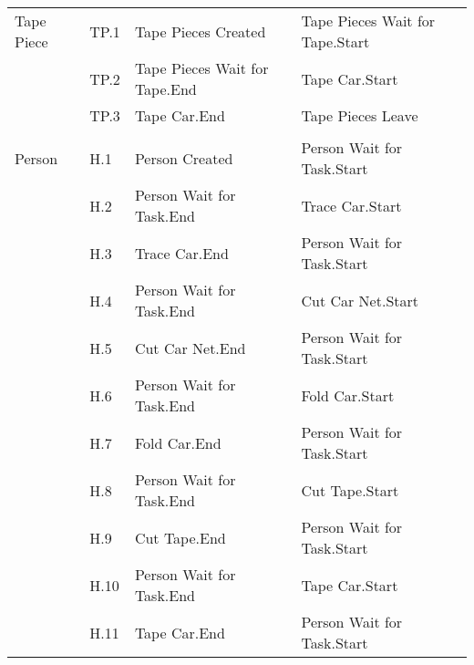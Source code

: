 \begin{tabular}{p{2.4cm}>{\raggedright\arraybackslash}p{1.2cm}>{\raggedright\arraybackslash}p{5.9cm}>{\raggedright\arraybackslash}p{5.9cm}}
Tape Piece & TP.1 & Tape Pieces Created & Tape Pieces Wait for Tape.Start \\
           & TP.2 & Tape Pieces Wait for Tape.End & Tape Car.Start \\
           & TP.3 & Tape Car.End & Tape Pieces Leave \\
     &      &              &              \\
Person & H.1 & Person Created & Person Wait for Task.Start \\
       & H.2 & Person Wait for Task.End & Trace Car.Start \\
       & H.3 & Trace Car.End & Person Wait for Task.Start \\
       & H.4 & Person Wait for Task.End & Cut Car Net.Start \\
       & H.5 & Cut Car Net.End & Person Wait for Task.Start \\
       & H.6 & Person Wait for Task.End & Fold Car.Start \\
       & H.7 & Fold Car.End & Person Wait for Task.Start \\
       & H.8 & Person Wait for Task.End & Cut Tape.Start \\
       & H.9 & Cut Tape.End & Person Wait for Task.Start \\
       & H.10 & Person Wait for Task.End & Tape Car.Start \\
       & H.11 & Tape Car.End & Person Wait for Task.Start \\\bottomrule
\end{tabular}
